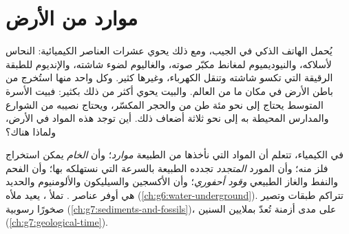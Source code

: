 \chapter{موارد من الأرض}\label{ch:g9:earth-resources}

يُحمل الهاتف الذكي في الجيب، ومع ذلك يحوي عشرات العناصر الكيميائية: النحاس
لأسلاكه، والنيوديميوم لمغانط مكبّر صوته، والغاليوم لضوء شاشته،
والإنديوم للطبقة الرقيقة التي تكسو شاشته وتنقل الكهرباء، وغيرها كثير.
وكل واحد منها استُخرج من باطن الأرض في مكان ما من العالم. والبيت يحوي
أكثر من ذلك بكثير: فبيت الأسرة المتوسط يحتاج إلى نحو مئة طن من 
 والحجر المكسّر، ويحتاج نصيبه من الشوارع والمدارس المحيطة به
إلى نحو ثلاثة أضعاف ذلك.
أين توجد هذه المواد في الأرض، ولماذا هناك؟

\begin{recall}
في الكيمياء، تتعلم أن المواد التي نأخذها من الطبيعة \emph{موارد}؛ وأن
\emph{الخام}  يمكن استخراج فلز منه؛ وأن المورد \emph{المتجدد} تجدده
الطبيعة بالسرعة التي نستهلكه بها؛ وأن الفحم والنفط والغاز الطبيعي
\emph{وقود أحفوري}؛ وأن الأكسجين والسيليكون والألومنيوم والحديد هي
أوفر عناصر .
 تملأ  ،  يعيد ملأه
(\cref{ch:g6:water-underground}).  تتراكم طبقات وتصير صخورًا
رسوبية (\cref{ch:g7:sediments-and-fossils})، على مدى أزمنة تُعدّ بملايين
السنين (\cref{ch:g7:geological-time}).
\end{recall}


